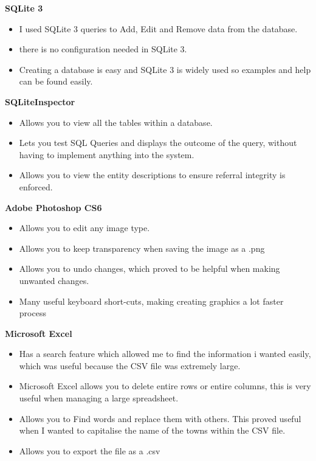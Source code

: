 \textbf{SQLite 3}
\begin{itemize}
	\item I used SQLite 3 queries to Add, Edit and Remove data from the database.
	\item there is no configuration needed in SQLite 3.
	\item Creating a database is easy and SQLite 3 is widely used so examples and help can be found easily.
\end{itemize}
\vspace{5mm}

\textbf{SQLiteInspector}
\begin{itemize}
	\item Allows you to view all the tables within a database.
	\item Lets you test SQL Queries and displays the outcome of the query, without having to implement anything into the system.
	\item Allows you to view the entity descriptions to ensure referral integrity is enforced.
\end{itemize}
\vspace{5mm}

\textbf{Adobe Photoshop CS6}
\begin{itemize}
	\item Allows you to edit any image type.
	\item Allows you to keep transparency when saving the image as a .png
	\item Allows you to undo changes, which proved to be helpful when making unwanted changes.
	\item Many useful keyboard short-cuts, making creating graphics a lot faster process
\end{itemize}
\vspace{5mm}

\textbf{Microsoft Excel}
\begin{itemize}
	\item Has a search feature which allowed me to find the information i wanted easily, which was useful because the CSV file was extremely large.
	\item Microsoft Excel allows you to delete entire rows or entire columns, this is very useful when managing a large spreadsheet.
	\item Allows you to Find words and replace them with others. This proved useful when I wanted to capitalise the name of the towns within the CSV file.
	\item Allows you to export the file as a .csv
\end{itemize}
\vspace{5mm}

